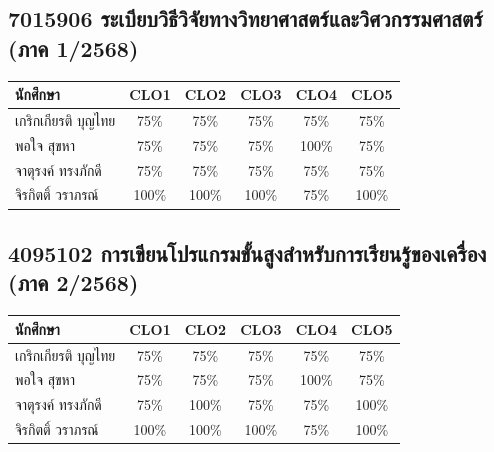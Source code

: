 \documentclass[12pt,a4paper]{article}
\begin{document}
\subsection*{7015906 ระเบียบวิธีวิจัยทางวิทยาศาสตร์และวิศวกรรมศาสตร์ (ภาค 1/2568)}
\begin{longtable}{|p{4.5cm}|c|c|c|c|c|}
\hline
\rowcolor{hdr}\color{white}\textbf{นักศึกษา} & \color{white}\textbf{CLO1} & \color{white}\textbf{CLO2} & \color{white}\textbf{CLO3} & \color{white}\textbf{CLO4} & \color{white}\textbf{CLO5} \\ \hline
\endfirsthead \hline \endhead
  เกริกเกียรติ บุญไทย & \cellcolor{pass}75\% & \cellcolor{pass}75\% & \cellcolor{pass}75\% & \cellcolor{pass}75\% & \cellcolor{pass}75\% \\ \hline
  พอใจ สุขหา & \cellcolor{pass}75\% & \cellcolor{pass}75\% & \cellcolor{pass}75\% & \cellcolor{pass}100\% & \cellcolor{pass}75\% \\ \hline
  จาตุรงค์ ทรงภักดี & \cellcolor{pass}75\% & \cellcolor{pass}75\% & \cellcolor{pass}75\% & \cellcolor{pass}75\% & \cellcolor{pass}75\% \\ \hline
  จิรกิตติ์ วราภรณ์ & \cellcolor{pass}100\% & \cellcolor{pass}100\% & \cellcolor{pass}100\% & \cellcolor{pass}75\% & \cellcolor{pass}100\% \\ \hline
\end{longtable}
\subsection*{4095102 การเขียนโปรแกรมขั้นสูงสำหรับการเรียนรู้ของเครื่อง (ภาค 2/2568)}
\begin{longtable}{|p{4.5cm}|c|c|c|c|c|}
\hline
\rowcolor{hdr}\color{white}\textbf{นักศึกษา} & \color{white}\textbf{CLO1} & \color{white}\textbf{CLO2} & \color{white}\textbf{CLO3} & \color{white}\textbf{CLO4} & \color{white}\textbf{CLO5} \\ \hline
\endfirsthead \hline \endhead
  เกริกเกียรติ บุญไทย & \cellcolor{pass}75\% & \cellcolor{pass}75\% & \cellcolor{pass}75\% & \cellcolor{pass}75\% & \cellcolor{pass}75\% \\ \hline
  พอใจ สุขหา & \cellcolor{pass}75\% & \cellcolor{pass}75\% & \cellcolor{pass}75\% & \cellcolor{pass}100\% & \cellcolor{pass}75\% \\ \hline
  จาตุรงค์ ทรงภักดี & \cellcolor{pass}75\% & \cellcolor{pass}100\% & \cellcolor{pass}75\% & \cellcolor{pass}75\% & \cellcolor{pass}100\% \\ \hline
  จิรกิตติ์ วราภรณ์ & \cellcolor{pass}100\% & \cellcolor{pass}100\% & \cellcolor{pass}100\% & \cellcolor{pass}75\% & \cellcolor{pass}100\% \\ \hline
\end{longtable}
\end{document}
